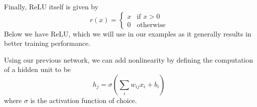 \documentclass[12pt,letterpaper]{book}
\theoremstyle{definition}
\begin{document}
  Finally, ReLU itself is given by 
  \[
    r(x) = 
    \begin{cases}
      x & \text{if } x > 0\\
      0 & \text{otherwise}  
    \end{cases}
  \]
  Below we have ReLU, which we will use in our examples as it generally results in better 
  training performance.
  \begin{center}
  \end{center}

  Using our previous network, we can add nonlinearity by defining the computation of a hidden unit to be 
  \[
    h_j = \sigma\left( \sum_{i}w_{ij}x_i + b_i \right)  
  \]
  where $\sigma$ is the activation function of choice. 
\end{document}
